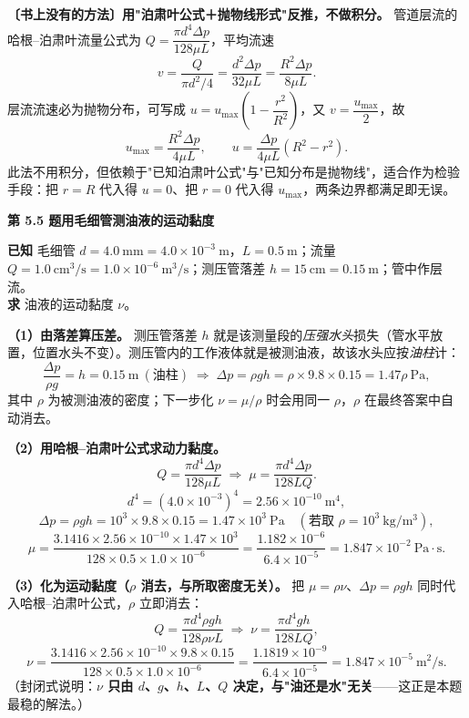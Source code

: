 \begin{banfa}
\textbf{〔书上没有的方法〕用"泊肃叶公式＋抛物线形式"反推，不做积分。} 管道层流的哈根--泊肃叶流量公式为 $Q=\dfrac{\pi d^4\Delta p}{128\mu L}$，平均流速
\[v=\frac{Q}{\pi d^2/4}=\frac{d^2\Delta p}{32\mu L}=\frac{R^2\Delta p}{8\mu L}.\]
层流流速必为抛物分布，可写成 $u=u_{\max}\left(1-\dfrac{r^2}{R^2}\right)$，又 $v=\dfrac{u_{\max}}{2}$，故
\[u_{\max}=\frac{R^2\Delta p}{4\mu L},\qquad u=\frac{\Delta p}{4\mu L}\left(R^2-r^2\right).\]
此法不用积分，但依赖于"已知泊肃叶公式"与"已知分布是抛物线"，适合作为检验手段：把 $r=R$ 代入得 $u=0$、把 $r=0$ 代入得 $u_{\max}$，两条边界都满足即无误。
\end{banfa}

\noindent\textbf{第 5.5 题\quad 用毛细管测油液的运动黏度}

\begin{jie}
\textbf{已知} 毛细管 $d=4.0\ \mathrm{mm}=4.0\times10^{-3}\ \mathrm{m}$，$L=0.5\ \mathrm{m}$；流量 $Q=1.0\ \mathrm{cm^3/s}=1.0\times10^{-6}\ \mathrm{m^3/s}$；测压管落差 $h=15\ \mathrm{cm}=0.15\ \mathrm{m}$；管中作层流。\\
\textbf{求} 油液的运动黏度 $\nu$。

\textbf{（1）由落差算压差。} 测压管落差 $h$ 就是该测量段的\emph{压强水头}损失（管水平放置，位置水头不变）。测压管内的工作液体就是被测油液，故该水头应按\emph{油柱}计：
\[\frac{\Delta p}{\rho g}=h=0.15\ \mathrm{m}\ (\text{油柱})\;\Longrightarrow\;\Delta p=\rho g h=\rho\times9.8\times0.15=1.47\rho\ \mathrm{Pa},\]
其中 $\rho$ 为被测油液的密度；下一步化 $\nu=\mu/\rho$ 时会用同一 $\rho$，$\rho$ 在最终答案中自动消去。

\textbf{（2）用哈根--泊肃叶公式求动力黏度。}
\[Q=\frac{\pi d^4\Delta p}{128\mu L}\;\Longrightarrow\;\mu=\frac{\pi d^4\Delta p}{128 LQ}.\]
\[d^4=(4.0\times10^{-3})^4=2.56\times10^{-10}\ \mathrm{m^4},\]
\[\Delta p=\rho g h=10^3\times9.8\times0.15=1.47\times10^3\ \mathrm{Pa}\quad(\text{若取 }\rho=10^3\ \mathrm{kg/m^3}),\]
\[\mu=\frac{3.1416\times2.56\times10^{-10}\times1.47\times10^3}{128\times0.5\times1.0\times10^{-6}}
=\frac{1.182\times10^{-6}}{6.4\times10^{-5}}=1.847\times10^{-2}\ \mathrm{Pa\cdot s}.\]

\textbf{（3）化为运动黏度（$\rho$ 消去，与所取密度无关）。} 把 $\mu=\rho\nu$、$\Delta p=\rho gh$ 同时代入哈根--泊肃叶公式，$\rho$ 立即消去：
\[Q=\frac{\pi d^4\rho gh}{128\rho\nu L}\;\Longrightarrow\;\nu=\frac{\pi d^4 gh}{128 LQ},\]
\[\nu=\frac{3.1416\times2.56\times10^{-10}\times9.8\times0.15}{128\times0.5\times1.0\times10^{-6}}
=\frac{1.1819\times10^{-9}}{6.4\times10^{-5}}=1.847\times10^{-5}\ \mathrm{m^2/s}.\]
（封闭式说明：\textbf{$\nu$ 只由 $d$、$g$、$h$、$L$、$Q$ 决定，与"油还是水"无关}——这正是本题最稳的解法。）


\end{jie}
